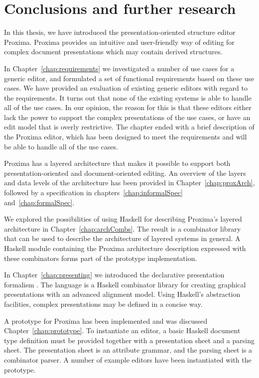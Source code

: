 \chapter{Conclusions and further research} \label{chap:conclusions}

In this thesis, we have introduced the presentation-oriented structure editor Proxima. Proxima provides an intuitive and user-friendly way of editing for complex document presentations which may contain derived structures.

In Chapter~\ref{chap:requirements} we investigated a number of use cases for a generic editor, and formulated a set of functional requirements based on these use cases. We have provided an evaluation of existing generic editors with regard to the requirements. It turns out that none of the existing systems is able to handle all of the use cases. In our opinion, the reason for this is that these editors either lack the power to support the complex presentations of the use cases, or have an edit model that is overly restrictive. The chapter ended with a brief description of the Proxima editor, which has been designed to meet the requirements and will be able to handle all of the use cases.

Proxima has a layered architecture that makes it possible to support both pre\-sen\-tation-oriented and document-oriented editing. An overview of the layers and data levels of the architecture has been provided in Chapter~\ref{chap:proxArch}, followed by a specification in chapters~\ref{chap:informalSpec} and~\ref{chap:formalSpec}. 

\bc We explored the possibilities of using Haskell for describing Proxima's layered architecture in Chapter~\ref{chap:archCombs}. The result is a combinator library that can be used to describe the architecture of layered systems in general. A Haskell module containing the Proxima architecture description expressed with these combinators forms part of the prototype implementation. \ec

In Chapter~\ref{chap:presenting} we introduced the declarative presentation formalism {\Xprez}. The language is a Haskell combinator library for creating graphical presentations with an advanced alignment model. Using Haskell's abstraction facilities, complex presentations may be defined in a concise way.

A prototype for Proxima  has been implemented and was discussed Chapter~\ref{chap:prototype}. To instantiate an editor, a basic Haskell document type definition must be provided together with a presentation sheet and a parsing sheet. The presentation sheet is an attribute grammar, and the parsing sheet is a combinator parser. A number of example editors have been instantiated with the prototype.


